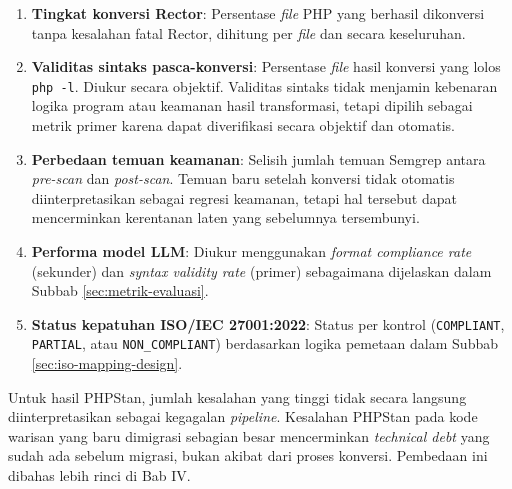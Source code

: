 \begin{enumerate}

    \item \textbf{Tingkat konversi Rector}: Persentase \textit{file} PHP yang berhasil dikonversi tanpa kesalahan fatal Rector, dihitung per \textit{file} dan secara keseluruhan.

    \item \textbf{Validitas sintaks pasca-konversi}: Persentase \textit{file} hasil konversi yang lolos \texttt{php -l}. Diukur secara objektif. Validitas sintaks tidak menjamin kebenaran logika program atau 
keamanan hasil transformasi, tetapi dipilih sebagai metrik primer 
karena dapat diverifikasi secara objektif dan otomatis.

    \item \textbf{Perbedaan temuan keamanan}: Selisih jumlah temuan Semgrep antara \textit{pre-scan} dan \textit{post-scan}. Temuan baru setelah konversi tidak otomatis diinterpretasikan sebagai regresi keamanan, tetapi
    hal tersebut dapat mencerminkan kerentanan laten yang sebelumnya tersembunyi.

    \item \textbf{Performa model LLM}: Diukur menggunakan \textit{format compliance rate} (sekunder) dan \textit{syntax validity rate} (primer) sebagaimana dijelaskan dalam Subbab \ref{sec:metrik-evaluasi}.

    \item \begin{sloppypar}\textbf{Status kepatuhan ISO/IEC 27001:2022}: Status per kontrol (\texttt{COMPLIANT}, \texttt{PARTIAL}, atau \texttt{NON\_COMPLIANT}) berdasarkan logika pemetaan dalam Subbab \ref{sec:iso-mapping-design}.\end{sloppypar}

\end{enumerate}

Untuk hasil PHPStan, jumlah kesalahan yang tinggi tidak secara langsung diinterpretasikan sebagai kegagalan \textit{pipeline}. Kesalahan PHPStan pada kode warisan yang baru dimigrasi sebagian besar mencerminkan \textit{technical debt} yang sudah ada sebelum migrasi, bukan akibat dari proses konversi. Pembedaan ini dibahas lebih rinci di Bab IV.